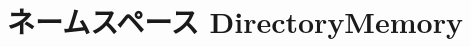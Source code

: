 \hypertarget{namespaceDirectoryMemory}{
\section{ネームスペース DirectoryMemory}
\label{namespaceDirectoryMemory}
}
